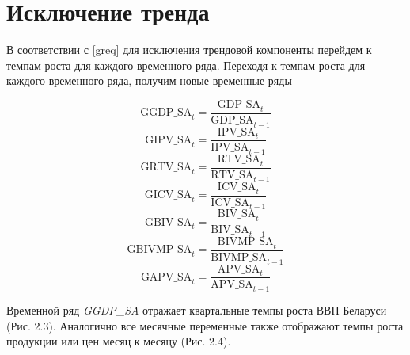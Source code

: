 \documentclass[a4paper, 14pt]{extreport}
\numberwithin{equation}{subsection}
\numberwithin{equation}{section}
\begin{document}
	\section{Исключение тренда}
	В соответствии с \ref{greq} для исключения трендовой компоненты перейдем к темпам роста для каждого временного ряда. Переходя к темпам роста для каждого временного ряда, получим новые временные ряды
	
	\begin{equation}
		\text{GGDP\_SA}_t=\dfrac{\text{GDP\_SA}_t}{\text{GDP\_SA}_{t-1}}
	\end{equation}
	\begin{equation}
		\text{GIPV\_SA}_t=\dfrac{\text{IPV\_SA}_t}{\text{IPV\_SA}_{t-1}}
	\end{equation}
	\begin{equation}
		\text{GRTV\_SA}_t=\dfrac{\text{RTV\_SA}_t}{\text{RTV\_SA}_{t-1}}
	\end{equation}
	\begin{equation}
		\text{GICV\_SA}_t=\dfrac{\text{ICV\_SA}_t}{\text{ICV\_SA}_{t-1}}
	\end{equation}
	\begin{equation}
		\text{GBIV\_SA}_t=\dfrac{\text{BIV\_SA}_t}{\text{BIV\_SA}_{t-1}}
	\end{equation}
	\begin{equation}
		\text{GBIVMP\_SA}_t=\dfrac{\text{BIVMP\_SA}_t}{\text{BIVMP\_SA}_{t-1}}
	\end{equation}
	\begin{equation}
		\text{GAPV\_SA}_t=\dfrac{\text{APV\_SA}_t}{\text{APV\_SA}_{t-1}}
	\end{equation}
	
	Временной ряд \textit{GGDP\_SA} отражает квартальные темпы роста ВВП Беларуси (Рис. 2.3). Аналогично все месячные переменные также отображают темпы роста продукции или цен месяц к месяцу (Рис. 2.4).
	
\end{document}
